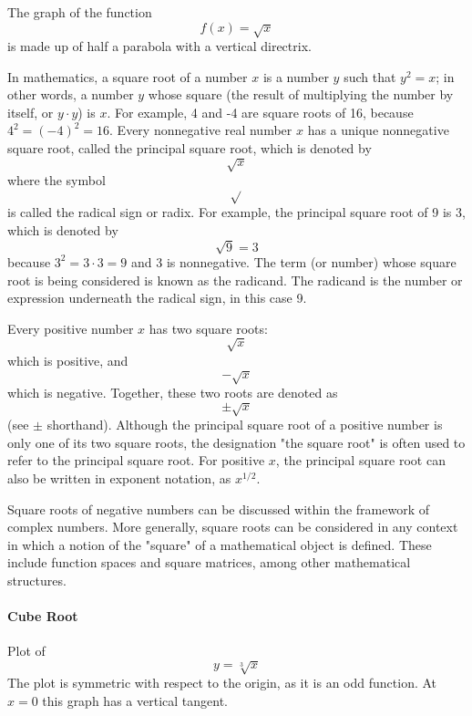 The graph of the function 
$$
f(x) = \sqrt{x}
$$
is made up of half a parabola with a vertical directrix.


In mathematics, a square root of a number $x$ is a number $y$ such that $y^2 = x$; in other words, a number $y$ whose square (the result of multiplying the number by itself, or $y \cdot y$) is $x$. For example, 4 and -4 are square roots of 16, because $4^2 = (-4)^2 = 16$. Every nonnegative real number $x$ has a unique nonnegative square root, called the principal square root, which is denoted by 
$$
\sqrt{x}
$$
where the symbol 
$$
\sqrt{}
$$
is called the radical sign or radix. For example, the principal square root of 9 is 3, which is denoted by 
$$
\sqrt{9} = 3
$$
because $3^2 = 3 \cdot 3 = 9$ and 3 is nonnegative. The term (or number) whose square root is being considered is known as the radicand. The radicand is the number or expression underneath the radical sign, in this case 9.

Every positive number $x$ has two square roots: 
$$
\sqrt{x}
$$
which is positive, and 
$$
-\sqrt{x}
$$
which is negative. Together, these two roots are denoted as 
$$
\pm \sqrt{x}
$$
(see $\pm$ shorthand). Although the principal square root of a positive number is only one of its two square roots, the designation "the square root" is often used to refer to the principal square root. For positive $x$, the principal square root can also be written in exponent notation, as $x^{1/2}$.

Square roots of negative numbers can be discussed within the framework of complex numbers. More generally, square roots can be considered in any context in which a notion of the "square" of a mathematical object is defined. These include function spaces and square matrices, among other mathematical structures.

\paragraph{Cube Root}

Plot of 
$$
y = \sqrt[3]{x}
$$
The plot is symmetric with respect to the origin, as it is an odd function. At $x = 0$ this graph has a vertical tangent.


